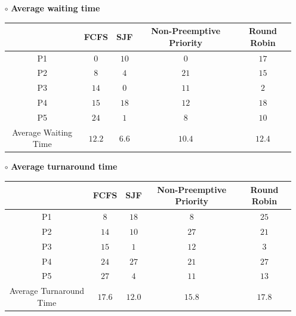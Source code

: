 \documentclass[13pt,a4paper]{article}
\begin{document}
\begin{enumerate}
			\item[$\circ$] \textbf{Average waiting time}
				\begin{center}
					\begin{tabular}{c|c|c|c|c}
						 & FCFS & SJF & Non-Preemptive Priority & Round Robin \\
						\hline
						P1 & $0$ & $10$ & $0$ & $17$ \\
						P2 & $8$ & $4$ & $21$ & $15$ \\
						P3 & $14$ & $0$ & $11$ & $2$ \\
						P4 & $15$ & $18$ & $12$ & $18$ \\
						P5 & $24$ & $1$ & $8$ & $10$ \\
						\hline
						Average Waiting Time & $12.2$ & $6.6$ & $10.4$ & $12.4$ \\
					\end{tabular}
				\end{center}
			\item[$\circ$] \textbf{Average turnaround time}
			\begin{center}
				\begin{tabular}{c|c|c|c|c}
					& FCFS & SJF & Non-Preemptive Priority & Round Robin \\
					\hline
					P1 & $8$ & $18$ & $8$ & $25$ \\
					P2 & $14$ & $10$ & $27$ & $21$ \\
					P3 & $15$ & $1$ & $12$ & $3$ \\
					P4 & $24$ & $27$ & $21$ & $27$ \\
					P5 & $27$ & $4$ & $11$ & $13$ \\
					\hline
					Average Turnaround Time & $17.6$ & $12.0$ & $15.8$ & $17.8$ \\
				\end{tabular}
			\end{center}
		\end{enumerate}
\end{document}
